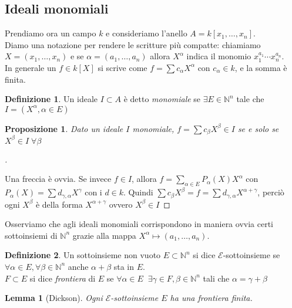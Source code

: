 \documentclass[a4paper,10pt]{article}
\theoremstyle{plain}
\newtheorem{lemma}[thm]{Lemma}
\newtheorem{prop}[thm]{Proposizione}
\theoremstyle{definition}
\newtheorem{defn}{Definizione}[section]
\newenvironment{myproof}[1][\proofname]{%
  \begin{proof}[#1]$ $\par\nobreak\ignorespaces
}{%
  \qedhere
  \end{proof}
}
\newcommand{\N}{\mathbb{N}}
\begin{document}
\subsection{Ideali monomiali}
Prendiamo ora un campo $k$ e consideriamo l'anello $A=k[x_1,\dots,x_n]$.\\
Diamo una notazione per rendere le scritture più compatte: chiamiamo $X=(x_1,\dots,x_n)$ e se $\alpha=(a_1,\dots,a_n)$ allora $X^\alpha$ indica il monomio $x_1^{a_1}\cdots x_n^{a_n}$.\\
In generale un $f\in k[X]$ si scrive come $f=\sum c_\alpha X^\alpha$ con $c_\alpha\in k$, e la somma è finita.\\
\begin{defn}
    Un ideale $I\subset A$ è detto \emph{monomiale} se $\exists E\in\N^n$ tale che $I=(X^\alpha,\alpha\in E)$
\end{defn}
\begin{prop}
    Dato un ideale $I$ monomiale, $f=\sum c_\beta X^\beta\in I$ se e solo se $X^\beta\in I\;\forall\beta$
\end{prop}
\begin{myproof}
    Una freccia è ovvia. Se invece $f\in I$, allora $f=\sum_{\alpha\in E}P_\alpha(X)X^\alpha$ con $P_\alpha(X)=\sum d_{\gamma,\alpha}X^\gamma$ con i $d\in k$. Quindi $\sum c_\beta X^\beta=f=\sum d_{\gamma,\alpha}X^{\alpha+\gamma}$, perciò ogni $X^\beta$ è della forma $X^{\alpha+\gamma}$ ovvero $X^\beta\in I$
\end{myproof}
Osserviamo che agli ideali monomiali corrispondono in maniera ovvia certi sottoinsiemi di $\N^n$ grazie alla mappa $X^\alpha\mapsto(a_1,\dots,a_n)$.
\begin{defn}
    Un sottoinsieme non vuoto $E\subset\N^n$ si dice $\mathcal E$-sottoinsieme se $\forall\alpha\in E,\forall\beta\in\N^n$ anche $\alpha+\beta$ sta in $E$.\\
    $F\subset E$ si dice \emph{frontiera} di $E$ se $\forall\alpha\in E\;\;\exists\gamma\in F,\beta\in\N^n$ tali che $\alpha=\gamma+\beta$
\end{defn}
\begin{lemma}[Dickson]
    Ogni $\mathcal E$-sottoinsieme $E$ ha una frontiera finita.
\end{lemma}
\end{document}
